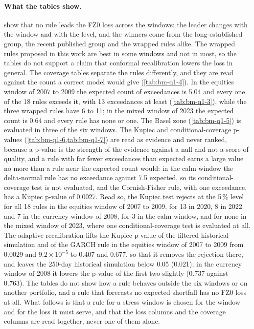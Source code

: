 \paragraph{What the tables show.}  show that no rule leads the FZ0 loss across the windows: the leader changes with the window and with the level, and the winners come from the long-established group, the recent published group and the wrapped rules alike. The wrapped rules proposed in this work are best in some windows and not in most, so the tables do not support a claim that conformal recalibration lowers the loss in general. The coverage tables separate the rules differently, and they are read against the count a correct model would give (\cref{tab:bm-q1-4}). In the equities window of 2007 to 2009 the expected count of exceedances is 5.04 and every one of the 18 rules exceeds it, with 13 exceedances at least (\cref{tab:bm-q1-3}), while the three wrapped rules have 6 to 11; in the mixed window of 2023 the expected count is 0.64 and every rule has none or one. The Basel zone (\cref{tab:bm-q1-5}) is evaluated in three of the six windows. The Kupiec and conditional-coverage p-values (\cref{tab:bm-q1-6,tab:bm-q1-7}) are read as evidence and never ranked, because a p-value is the strength of the evidence against a null and not a score of quality, and a rule with far fewer exceedances than expected earns a large value no more than a rule near the expected count would: in the calm window the delta-normal rule has no exceedance against 7.5 expected, so its conditional-coverage test is not evaluated, and the Cornish-Fisher rule, with one exceedance, has a Kupiec p-value of 0.0027. Read so, the Kupiec test rejects at the 5\,\% level for all 18 rules in the equities window of 2007 to 2009, for 13 in 2020, 8 in 2022 and 7 in the currency window of 2008, for 3 in the calm window, and for none in the mixed window of 2023, where one conditional-coverage test is evaluated at all. The adaptive recalibration lifts the Kupiec p-value of the filtered historical simulation and of the GARCH rule in the equities window of 2007 to 2009 from 0.0029 and \ensuremath{9.2\times10^{-5}} to 0.407 and 0.677, so that it removes the rejection there, and leaves the 250-day historical simulation below 0.05 (0.021); in the currency window of 2008 it lowers the p-value of the first two slightly (0.737 against 0.763). The tables do not show how a rule behaves outside the six windows or on another portfolio, and a rule that forecasts no expected shortfall has no FZ0 loss at all. What follows is that a rule for a stress window is chosen for the window and for the loss it must serve, and that the loss columns and the coverage columns are read together, never one of them alone.

